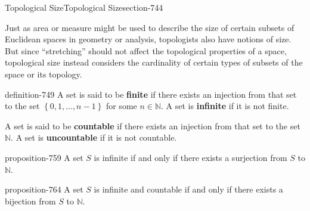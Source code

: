 \documentclass[oneside,10pt,]{article}
\newcommand{\terminology}[1]{\textbf{#1}}
\newcommand{\mb}{\mathbb}
\newcommand{\setList}[1]{\left\{#1\right\}}
\begin{document}
\begin{sectionptx}{Topological Size}{}{Topological Size}{}{}{section-744}
\begin{introduction}{}%
\hypertarget{p-747}{}%
Just as area or measure might be used to describe the size of certain subsets of Euclidean spaces in geometry or analysis, topologists also have notions of size. But since ``stretching'' should not affect the topological properties of a space, topological size instead considers the cardinality of certain types of subsets of the space or its topology.%
\end{introduction}%
\begin{definition}{}{definition-749}%
\hypertarget{p-750}{}%
A set is said to be \terminology{finite} if there exists an injection from that set to the set \(\setList{0,1,\dots,n-1}\) for some \(n\in\mathbb N\). A set is \terminology{infinite} if it is not finite.%
\par
\hypertarget{p-755}{}%
A set is said to be \terminology{countable} if there exists an injection from that set to the set \(\mb N\). A set is \terminology{uncountable} if it is not countable.%
\end{definition}
\begin{proposition}{}{}{proposition-759}%
\hypertarget{p-760}{}%
A set \(S\) is infinite if and only if there exists a surjection from \(S\) to \(\mb N\).%
\end{proposition}
\begin{proposition}{}{}{proposition-764}%
\hypertarget{p-765}{}%
A set \(S\) is infinite and countable if and only if there exists a bijection from \(S\) to \(\mb N\).%
\end{proposition}
\end{sectionptx}
%
%
\typeout{************************************************}
\typeout{************************************************}
%
\end{document}
